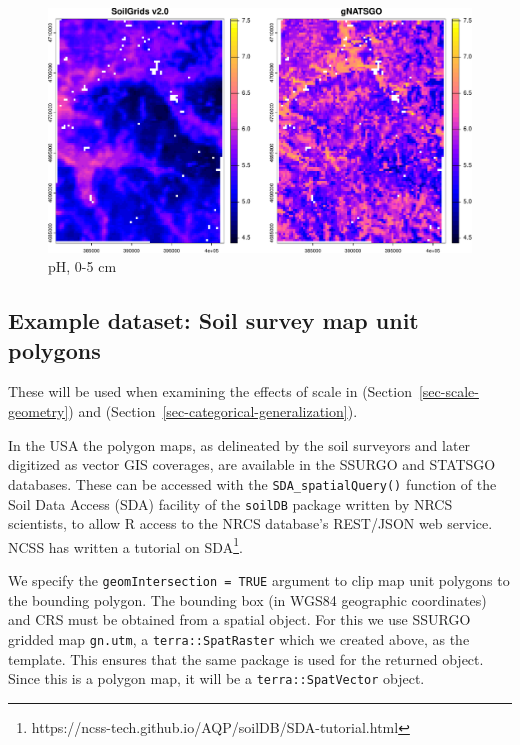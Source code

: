 \documentclass[
  letterpaper,
  DIV=11,
  numbers=noendperiod]{scrartcl}
\begin{document}
\begin{figure}[H]

{\centering \includegraphics{PatternAnalysisWorkshopTutorial_files/figure-pdf/fig-sg-gn-utm-1.pdf}

}

\caption{\label{fig-sg-gn-utm}pH, 0-5 cm}

\end{figure}

\hypertarget{sec-import-gssurgo}{%
\subsection{Example dataset: Soil survey map unit
polygons}\label{sec-import-gssurgo}}

These will be used when examining the effects of scale in
(Section~\ref{sec-scale-geometry}) and
(Section~\ref{sec-categorical-generalization}).

In the USA the polygon maps, as delineated by the soil surveyors and
later digitized as vector GIS coverages, are available in the SSURGO and
STATSGO databases. These can be accessed with the
\texttt{SDA\_spatialQuery()} function of the Soil Data Access (SDA)
facility of the \texttt{soilDB} package written by NRCS scientists, to
allow R access to the NRCS database's REST/JSON web service. NCSS has
written a tutorial on SDA\footnote{https://ncss-tech.github.io/AQP/soilDB/SDA-tutorial.html}.

We specify the \texttt{geomIntersection\ =\ TRUE} argument to clip map
unit polygons to the bounding polygon. The bounding box (in WGS84
geographic coordinates) and CRS must be obtained from a spatial object.
For this we use SSURGO gridded map \texttt{gn.utm}, a
\texttt{terra::SpatRaster} which we created above, as the template. This
ensures that the same package is used for the returned object. Since
this is a polygon map, it will be a \texttt{terra::SpatVector} object.
\end{document}
